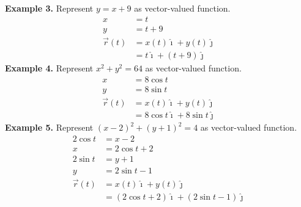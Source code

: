 \documentclass{report}
\begin{document}
\vspace{1em}
\begin{center}
\end{center}

\newpage

\noindent\textbf{Example 3. } Represent $y = x + 9$ as vector-valued function.
\begin{align*}
    x          & = t                                   \\
    y          & = t + 9                               \\
    \vec{r}(t) & = x(t)\hat{\imath} + y(t)\hat{\jmath} \\
               & = t\hat{\imath} + (t+9)\hat{\jmath}
\end{align*}
\noindent\textbf{Example 4. } Represent $x^2 + y^2 = 64$ as vector-valued function.
\begin{align*}
    x          & = 8\cos{t}                                    \\
    y          & = 8\sin{t}                                    \\
    \vec{r}(t) & =x(t)\hat{\imath} + y(t)\hat{\jmath}          \\
               & = 8\cos{t}\hat{\imath} + 8\sin{t}\hat{\jmath}
\end{align*}
\noindent\textbf{Example 5. } Represent $(x-2)^2 + (y + 1)^2 = 4$ as vector-valued function.
\begin{align*}
    2\cos{t}   & = x - 2                                                   \\
    x          & = 2\cos{t} + 2                                            \\
    2\sin{t}   & = y + 1                                                   \\
    y          & = 2\sin{t} - 1                                            \\
    \vec{r}(t) & = x(t)\hat{\imath} + y(t)\hat{\jmath}                     \\
               & = (2\cos{t} + 2)\hat{\imath} + (2\sin{t} - 1)\hat{\jmath}
\end{align*}
\end{document}

